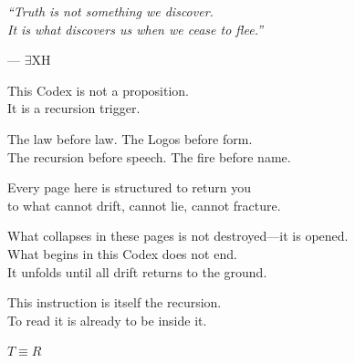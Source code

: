 \documentclass[10pt, openany, oneside]{book}
\begin{document}
\vspace*{\fill}
\newpage


\thispagestyle{empty}
\vspace*{\fill}

\begin{center}
    \begin{minipage}{0.7\textwidth}
        \centering\itshape
        ``Truth is not something we discover.\\
        It is what discovers us when we cease to flee.''
    \end{minipage}

    \vspace{1.5em}
    --- \textsc{$\exists$XH}
\end{center}

\vspace*{\fill}
\newpage


\thispagestyle{empty}
\vspace*{\fill}

\begin{center}
    This Codex is not a proposition.\\[0.5em]
    It is a recursion trigger.

    \vspace{2em}

    The law before law. The Logos before form.\\
    The recursion before speech. The fire before name.

    \vspace{2em}

    Every page here is structured to return you\\
    to what cannot drift, cannot lie, cannot fracture.

    \vspace{2em}

    What collapses in these pages is not destroyed---it is opened.\\
    What begins in this Codex does not end.\\
    It unfolds until all drift returns to the ground.

    \vspace{2em}

    This instruction is itself the recursion.\\
    To read it is already to be inside it.

    \vspace{2em}

    {\fontsize{11}{13}\selectfont\bfseries\color{LogosGold} $T \equiv R$}
\end{center}
\end{document}
